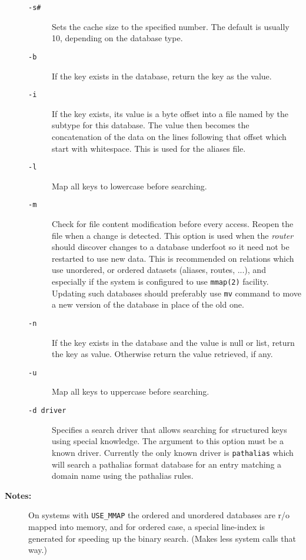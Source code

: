 \begin{description}
\begin{description}
\item[{\tt -s\#}] \mbox{}

Sets the cache size to the specified number. 
The default is usually 10, depending on the database type. 

\item[{\tt -b}] \mbox{}

If the key exists in the database, return the key 
as the value. 

\item[{\tt -i}] \mbox{}

If the key exists, its value is a byte offset into 
a file named by the subtype for this database. The value then becomes 
the concatenation of the data on the lines following that offset which 
start with whitespace. This is used for the aliases file. 

\item[{\tt -l}] \mbox{}

Map all keys to lowercase before searching.

\item[{\tt -m}] \mbox{}

Check for file content modification before every 
access. Reopen the file when a change is detected. This option is 
used when the {\em router} should discover changes to a database
underfoot so it need not be restarted to use new data. This is 
recommended on relations which use unordered, or ordered datasets 
(aliases, routes, ...), and especially if the system is configured 
to use {\tt mmap(2)} facility. Updating such databases should 
preferably use {\tt mv} command to move a new version of the 
database in place of the old one. 

\item[{\tt -n}] \mbox{}

If the key exists in the database and the value is 
null or list, return the key as value. Otherwise return the value 
retrieved, if any. 

\item[{\tt -u}] \mbox{}

Map all keys to uppercase before searching. 

\item[{\tt -d driver}] \mbox{}

Specifies a search driver that allows
searching for structured keys using special knowledge. The 
argument to this option must be a known driver. Currently the 
only known driver is {\tt pathalias} which will search a
pathalias format database for an entry matching a domain name 
using the pathalias rules.

\end{description}


\item[{\bf Notes:}] \mbox{}

On systems with {\tt USE\_MMAP} the ordered 
and unordered databases are r/o mapped into memory, and for ordered 
case, a special line-index is generated for speeding up the binary 
search. (Makes less system calls that way.)

\end{description}


